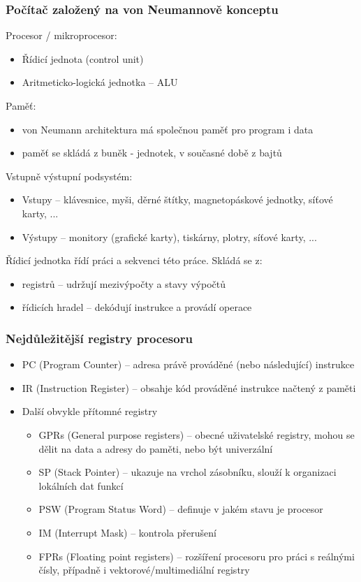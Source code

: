 \documentclass{beamer}
\begin{document}
\begin{frame}
\frametitle{Počítač založený na von Neumannově konceptu}

Procesor / mikroprocesor:
\begin{itemize}
\item Řídicí jednota (control unit)
\item Aritmeticko-logická jednotka -- ALU
\end{itemize}

Paměť: 
\begin{itemize}
\item von Neumann architektura má společnou paměť pro program i data
\item paměť se skládá z buněk - jednotek, v současné době z bajtů
\end{itemize}

Vstupně výstupní podsystém:
\begin{itemize}
\item Vstupy -- klávesnice, myši, děrné štítky, magnetopáskové jednotky, síťové karty, ...
\item Výstupy -- monitory (grafické karty), tiskárny, plotry, síťové karty, ...
\end{itemize}

Řídicí jednotka řídí práci a sekvenci této práce. Skládá se z:
\begin{itemize}
\item registrů – udržují mezivýpočty a stavy výpočtů
\item řídicích hradel -- dekódují instrukce a provádí operace
\end{itemize}
\end{frame}


\begin{frame}
\frametitle{Nejdůležitější registry procesoru}
\begin{itemize}
\item PC (Program Counter) -- adresa právě prováděné (nebo následující) instrukce
\item IR (Instruction Register) -- obsahje kód prováděné instrukce načtený z paměti
\item Další obvykle přítomné registry
\begin{itemize}
\item GPRs (General purpose registers) -- obecné uživatelské registry, mohou se dělit na data a adresy do paměti, nebo být univerzální
\item SP (Stack Pointer) -- ukazuje na vrchol zásobníku, slouží k organizaci lokálních dat funkcí
\item PSW (Program Status Word) -- definuje v jakém stavu je procesor
\item IM (Interrupt Mask) -- kontrola přerušení
\item FPRs (Floating point registers) -- rozšíření procesoru pro práci s reálnými čísly, případně i vektorové/multimediální registry
\end{itemize}
\end{itemize}
\end{frame}
\end{document}
